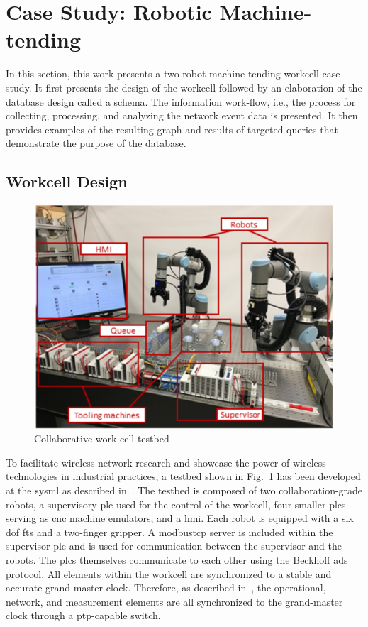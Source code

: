 \section{Case Study: Robotic Machine-tending}
In this section, this work presents a two-robot machine tending workcell case study.  It first presents the design of the workcell followed by an elaboration of the database design called a schema.  The information work-flow, i.e., the process for collecting, processing, and analyzing the network event data is presented.  It then provides examples of the resulting graph and results of targeted queries that demonstrate the purpose of the database. 
\subsection{Workcell Design}

\begin{figure}[!ht]
	\centering
	\includegraphics[width=\textwidth]{./chapter-gdb-appl/figures/cellShot}
	\caption{Collaborative work cell testbed}
	\label{gdbappl:fig::workcell}
\end{figure}

To facilitate wireless network research and showcase the power of wireless technologies in industrial practices, a testbed shown in Fig.~\ref{gdbappl:fig::workcell} has been developed at the \gls{sysml} as described in~\cite{Liu2019vancouver}. The testbed is composed of two collaboration-grade robots, a supervisory \gls{plc} used for the control of the workcell, four smaller \glspl{plc} serving as \gls{cnc} machine emulators, and a \gls{hmi}.  Each robot is equipped with a six \gls{dof} \gls{fts} and a two-finger gripper. A \Gls{modbustcp} server is included within the supervisor \gls{plc} and is used for communication between the supervisor and the robots.  The \glspl{plc} themselves communicate to each other using the Beckhoff \gls{ads} protocol. All elements within the workcell are synchronized to a stable and accurate grand-master clock. Therefore, as described in~\cite{Liu2019vancouver}, the operational, network, and measurement elements are all synchronized to the grand-master clock through a \gls{ptp}-capable switch. 

